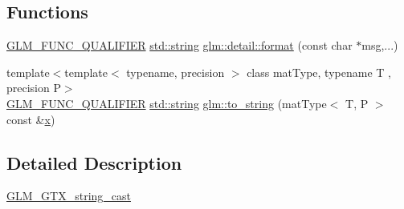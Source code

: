 \subsection*{Functions}
\begin{DoxyCompactItemize}
\item 
\mbox{\hyperlink{setup_8hpp_a33fdea6f91c5f834105f7415e2a64407}{G\+L\+M\+\_\+\+F\+U\+N\+C\+\_\+\+Q\+U\+A\+L\+I\+F\+I\+ER}} \mbox{\hyperlink{glad_8h_ac83513893df92266f79a515488701770}{std\+::string}} \mbox{\hyperlink{namespaceglm_1_1detail_acd5305bbd1c5417b1eb770faf8229d14}{glm\+::detail\+::format}} (const char $\ast$msg,...)
\item 
{\footnotesize template$<$template$<$ typename, precision $>$ class mat\+Type, typename T , precision P$>$ }\\\mbox{\hyperlink{setup_8hpp_a33fdea6f91c5f834105f7415e2a64407}{G\+L\+M\+\_\+\+F\+U\+N\+C\+\_\+\+Q\+U\+A\+L\+I\+F\+I\+ER}} \mbox{\hyperlink{glad_8h_ac83513893df92266f79a515488701770}{std\+::string}} \mbox{\hyperlink{group__gtx__string__cast_ga7b4f9233593bbf1d53762f801ef56fe6}{glm\+::to\+\_\+string}} (mat\+Type$<$ T, P $>$ const \&\mbox{\hyperlink{glad_8h_a92d0386e5c19fb81ea88c9f99644ab1d}{x}})
\end{DoxyCompactItemize}


\subsection{Detailed Description}
\mbox{\hyperlink{group__gtx__string__cast}{G\+L\+M\+\_\+\+G\+T\+X\+\_\+string\+\_\+cast}} 